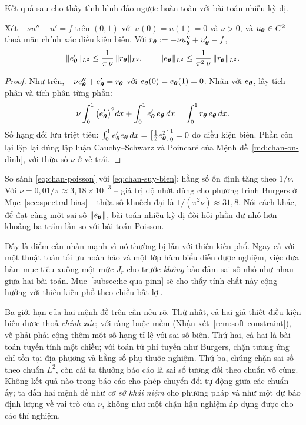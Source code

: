 Kết quả sau cho thấy tình hình đảo ngược hoàn toàn với bài toán nhiễu kỳ dị.
 
\begin{menhde}
\label{md:chan-suy-bien}
Xét $-\nu u'' + u' = f$ trên $(0,1)$ với $u(0) = u(1) = 0$ và $\nu > 0$, và
$u_{\bm{\theta}} \in C^2$ thoả mãn chính xác điều kiện biên. Với
$r_{\bm{\theta}} := -\nu u_{\bm{\theta}}'' + u_{\bm{\theta}}' - f$,
\begin{equation}
\lVert e_{\bm{\theta}}'\rVert_{L^2} \le \frac{1}{\pi\,\nu}\,\lVert r_{\bm{\theta}}\rVert_{L^2},
\qquad
\lVert e_{\bm{\theta}}\rVert_{L^2} \le \frac{1}{\pi^{2}\,\nu}\,\lVert r_{\bm{\theta}}\rVert_{L^2}.
\label{eq:chan-suy-bien}
\end{equation}
\end{menhde}
 
\begin{proof}
Như trên, $-\nu e_{\bm{\theta}}'' + e_{\bm{\theta}}' = r_{\bm{\theta}}$ với
$e_{\bm{\theta}}(0) = e_{\bm{\theta}}(1) = 0$. Nhân với $e_{\bm{\theta}}$, lấy tích phân và
tích phân từng phần:
\[
\nu\int_0^1 \big(e_{\bm{\theta}}'\big)^2 dx
 + \int_0^1 e_{\bm{\theta}}'\,e_{\bm{\theta}}\,dx
 = \int_0^1 r_{\bm{\theta}}\,e_{\bm{\theta}}\,dx .
\]
Số hạng đối lưu triệt tiêu:
$\int_0^1 e_{\bm{\theta}}'e_{\bm{\theta}}\,dx
= \big[\tfrac12 e_{\bm{\theta}}^2\big]_0^1 = 0$ do điều kiện biên. Phần còn lại lặp
lại đúng lập luận Cauchy--Schwarz và Poincaré của
Mệnh đề~\ref{md:chan-on-dinh}, với thừa số $\nu$ ở vế trái.
\end{proof}
 
\begin{nhanxet}
\label{nx:doc-chan}
So sánh \eqref{eq:chan-poisson} với \eqref{eq:chan-suy-bien}: hằng số ổn định
tăng theo $1/\nu$. Với $\nu = 0{,}01/\pi \approx 3{,}18\times10^{-3}$ -- giá trị
độ nhớt dùng cho phương trình Burgers ở Mục~\ref{sec:spectral-bias} -- thừa số
khuếch đại là $1/(\pi^2\nu) \approx 31{,}8$. Nói cách khác, để đạt cùng một sai
số $\lVert e_{\bm{\theta}}\rVert$, bài toán nhiễu kỳ dị đòi hỏi phần dư nhỏ hơn khoảng ba
trăm lần so với bài toán Poisson.
 
Đây là điểm cần nhấn mạnh vì nó thường bị lẫn với thiên kiến phổ. Ngay cả với một
thuật toán tối ưu hoàn hảo và một lớp hàm biểu diễn được nghiệm, việc đưa hàm mục
tiêu xuống một mức $J_r$ cho trước \emph{không} bảo đảm sai số nhỏ như nhau giữa
hai bài toán. Mục~\ref{subsec:he-qua-pinn} sẽ cho thấy tính chất này cộng hưởng
với thiên kiến phổ theo chiều bất lợi.
 
Ba giới hạn của hai mệnh đề trên cần nêu rõ. Thứ nhất, cả hai giả thiết điều kiện
biên được thoả \emph{chính xác}; với ràng buộc mềm
(Nhận xét~\ref{rem:soft-constraint}), vế phải phải cộng thêm một số hạng tỉ lệ
với sai số biên. Thứ hai, cả hai là bài toán tuyến tính một chiều; với toán tử
phi tuyến như Burgers, chặn tương ứng chỉ tồn tại địa phương và hằng số phụ thuộc
nghiệm. Thứ ba, chúng chặn sai số theo chuẩn $L^2$, còn cái ta thường báo cáo là
sai số tương đối theo chuẩn vô cùng. Không kết quả nào trong báo cáo cho phép
chuyển đổi tự động giữa các chuẩn ấy; ta dẫn hai mệnh đề như \emph{cơ sở khái
niệm} cho phương pháp và như một dự báo định lượng về vai trò của $\nu$, không
như một chặn hậu nghiệm áp dụng được cho các thí nghiệm.
\end{nhanxet}
 
